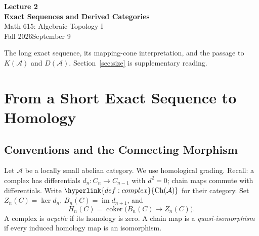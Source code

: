 \documentclass[11pt]{article}
\newcommand{\coursetitle}[3]{\begin{center}{\large\bfseries\color{teal}#1}\\[4pt]{\LARGE\bfseries\color{teal}#2}\\[6pt]Math 615: Algebraic Topology I\\Fall 2026\quad\textbar\quad #3\end{center}}
\newcommand{\coursecontents}{{\small\setlength{\parskip}{0pt}\tableofcontents}}
\newcommand{\im}{\operatorname{im}}
\newcommand{\coker}{\operatorname{coker}}
\newcommand{\A}{\mathcal A}
\newcommand{\Ch}[1]{\hyperlink{def:complex}{\operatorname{Ch}(#1)}}
\begin{document}
\coursetitle{Lecture 2}{Exact Sequences and Derived Categories}{September 9}
\noindent
The long exact sequence, its mapping-cone interpretation, and the passage to $K(\A)$ and $D(\A)$. Section~\ref{sec:size} is supplementary reading.

\coursecontents

\section{From a Short Exact Sequence to Homology}\label{sec:les}
\subsection{Conventions and the Connecting Morphism}
Let $\A$ be a locally small abelian category. We use homological grading. Recall:
\hypertarget{def:complex}{}a complex has differentials $d_n:C_n\to C_{n-1}$ with $d^2=0$; chain maps commute with differentials. Write $\Ch{\A}$ for their category.
\hypertarget{def:homology}{}Set $Z_n(C)=\ker d_n$, $B_n(C)=\im d_{n+1}$, and
\[
H_n(C)=\coker\bigl(B_n(C)\longrightarrow Z_n(C)\bigr).
\]
A complex is \emph{acyclic} if its homology is zero. A chain map is a \emph{quasi-isomorphism} if every induced homology map is an isomorphism.
\end{document}
